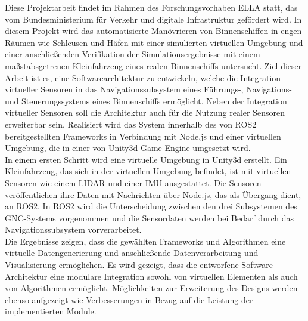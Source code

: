 Diese Projektarbeit findet im Rahmen des Forschungsvorhaben \ac{ELLA} statt, das vom Bundesministerium für Verkehr und digitale Infrastruktur gefördert wird. In diesem Projekt wird das automatisierte Manövrieren von Binnenschiffen in engen Räumen wie Schleusen und Häfen mit einer simulierten virtuellen Umgebung und einer anschließenden Verifikation der Simulationsergebnisse mit einem maßstabsgetreuen Kleinfahrzeug eines realen Binnenschiffs untersucht. Ziel dieser Arbeit ist es, eine Softwarearchitektur zu entwickeln, welche die Integration virtueller Sensoren in das Navigationssubsystem eines Führungs-, Navigations- und Steuerungssystems eines Binnenschiffs ermöglicht. Neben der Integration virtueller Sensoren soll die Architektur auch für die Nutzung realer Sensoren erweiterbar sein. Realisiert wird das System innerhalb des von ROS2 bereitgestellten Frameworks in Verbindung mit Node.js und einer virtuellen Umgebung, die in einer von Unity3d Game-Engine umgesetzt wird. \\


In einem ersten Schritt wird eine virtuelle Umgebung in Unity3d erstellt. Ein Kleinfahrzeug, das sich in der virtuellen Umgebung befindet, ist mit virtuellen Sensoren wie einem \ac{LIDAR} und einer \ac{IMU} ausgestattet. Die Sensoren veröffentlichen ihre Daten mit Nachrichten über Node.js, das als Übergang dient, an ROS2. In ROS2 wird die Unterscheidung zwischen den drei Subsystemen des \ac{GNC}-Systems vorgenommen und die Sensordaten werden bei Bedarf durch das Navigationssubsystem vorverarbeitet.\\

Die Ergebnisse zeigen, dass die gewählten Frameworks und Algorithmen eine virtuelle Datengenerierung und anschließende Datenverarbeitung und Visualisierung ermöglichen. Es wird gezeigt, dass die entworfene Software-Architektur eine modulare Integration sowohl von virtuellen Elementen als auch von Algorithmen ermöglicht. Möglichkeiten zur Erweiterung des Designs werden ebenso aufgezeigt wie Verbesserungen in Bezug auf die Leistung der implementierten Module.

